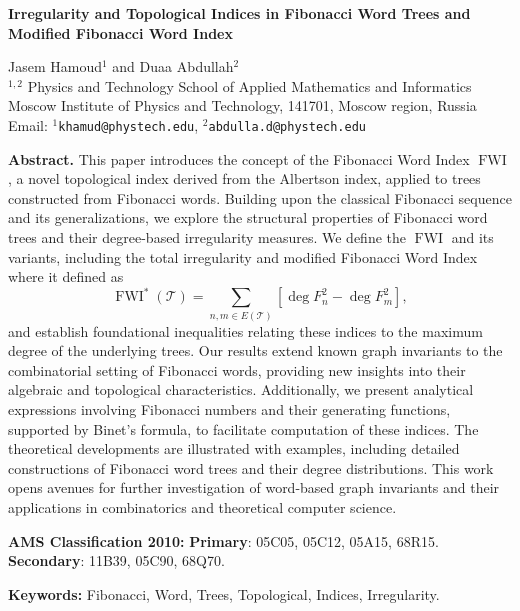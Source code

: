 \documentclass[12pt, a4paper]{article}
\begin{document}
\begin{center}
{\large \bf Irregularity and Topological Indices in Fibonacci Word Trees and Modified Fibonacci Word Index}
\end{center}
\begin{center}
 Jasem Hamoud$^1$ and Duaa Abdullah$^{2}$\\[6pt]
 $^{1,2}$ Physics and Technology School of Applied Mathematics and Informatics \\
Moscow Institute of Physics and Technology, 141701, Moscow region, Russia\\[6pt]

Email: 	 $^{1}${\tt khamud@phystech.edu},
 $^{2}${\tt abdulla.d@phystech.edu}
\end{center}
\noindent
\textbf{Abstract.}
This paper introduces the concept of the Fibonacci Word Index $\operatorname{FWI}$, a novel topological index derived from the Albertson index, applied to trees constructed from Fibonacci words. Building upon the classical Fibonacci sequence and its generalizations, we explore the structural properties of Fibonacci word trees and their degree-based irregularity measures. We define the $\operatorname{FWI}$ and its variants, including the total irregularity and modified Fibonacci Word Index where it defined as
\[
\operatorname{FWI}^*(\mathscr{T})=\sum_{n,m\in E(\mathscr{T})}[\deg F_n^2-\deg F_m^2],
\]
and establish foundational inequalities relating these indices to the maximum degree of the underlying trees. Our results extend known graph invariants to the combinatorial setting of Fibonacci words, providing new insights into their algebraic and topological characteristics. Additionally, we present analytical expressions involving Fibonacci numbers and their generating functions, supported by Binet’s formula, to facilitate computation of these indices. The theoretical developments are illustrated with examples, including detailed constructions of Fibonacci word trees and their degree distributions. This work opens avenues for further investigation of word-based graph invariants and their applications in combinatorics and theoretical computer science.

\noindent\textbf{AMS Classification 2010:} \textbf{Primary}: 05C05, 05C12, 05A15, 68R15. \textbf{Secondary}: 11B39, 05C90, 68Q70.


\noindent\textbf{Keywords:} Fibonacci, Word, Trees, Topological, Indices, Irregularity.

\end{document}
